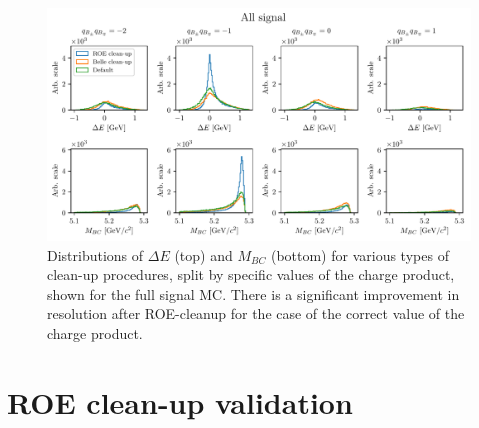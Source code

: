 \begin{figure}[H]
\centering
\captionsetup{width=0.8\linewidth}
\includegraphics[width=\linewidth]{fig/roe_split}
\caption{Distributions of $\Delta E$ (top) and $M_{BC}$ (bottom) for various types of clean-up procedures, split by specific values of the charge product, shown for the full signal MC. There is a significant improvement in resolution after ROE-cleanup for the case of the correct value of the charge product.}
\label{fig:roe_split}
\end{figure}

\section{ROE clean-up validation}

